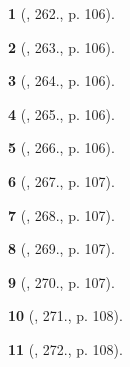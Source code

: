 \documentclass{article}
\newtheorem{baitoan}{}
\begin{document}
\begin{baitoan}[\cite{Nguyen_Buu_Can_500_BT_Hoa_Hoc_THCS}, 262., p. 106]
	
\end{baitoan}

\begin{baitoan}[\cite{Nguyen_Buu_Can_500_BT_Hoa_Hoc_THCS}, 263., p. 106]
	
\end{baitoan}

\begin{baitoan}[\cite{Nguyen_Buu_Can_500_BT_Hoa_Hoc_THCS}, 264., p. 106]
	
\end{baitoan}

\begin{baitoan}[\cite{Nguyen_Buu_Can_500_BT_Hoa_Hoc_THCS}, 265., p. 106]
	
\end{baitoan}

\begin{baitoan}[\cite{Nguyen_Buu_Can_500_BT_Hoa_Hoc_THCS}, 266., p. 106]
	
\end{baitoan}

\begin{baitoan}[\cite{Nguyen_Buu_Can_500_BT_Hoa_Hoc_THCS}, 267., p. 107]
	
\end{baitoan}

\begin{baitoan}[\cite{Nguyen_Buu_Can_500_BT_Hoa_Hoc_THCS}, 268., p. 107]
	
\end{baitoan}

\begin{baitoan}[\cite{Nguyen_Buu_Can_500_BT_Hoa_Hoc_THCS}, 269., p. 107]
	
\end{baitoan}

\begin{baitoan}[\cite{Nguyen_Buu_Can_500_BT_Hoa_Hoc_THCS}, 270., p. 107]
	
\end{baitoan}

\begin{baitoan}[\cite{Nguyen_Buu_Can_500_BT_Hoa_Hoc_THCS}, 271., p. 108]
	
\end{baitoan}

\begin{baitoan}[\cite{Nguyen_Buu_Can_500_BT_Hoa_Hoc_THCS}, 272., p. 108]
	
\end{baitoan}
\end{document}
